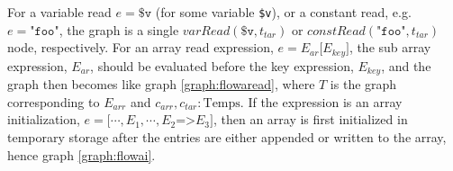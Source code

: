 \begin{graph}
{\begin{adjustbox}{max size={.24\textwidth}{.25\textheight}}
\end{adjustbox}}%
\hspace*{\fill}
\end{graph}

For a variable read $e = \texttt{\$v}$ (for some variable \texttt{\$v}), or a constant read, e.g. $e = \texttt{"foo"}$, the graph is a single $\mathit{varRead}(\texttt{\$v}, t_{tar})$ or $\mathit{constRead}(\texttt{"foo"}, t_{tar})$ node, respectively. For an array read expression, $e = E_{ar}\texttt[E_{key}\texttt{]}$, the sub array expression, $E_{ar}$, should be evaluated before the key expression, $E_{key}$, and the graph then becomes like graph \ref{graph:flowaread}, where $T$ is the graph corresponding to $E_{arr}$ and $c_{arr}, c_{tar} : \text{Temps}$. If the expression is an array initialization, $e = \texttt{[}\cdots, E_1, \cdots, E_2\texttt{=>}E_3\texttt{]}$, then an array is first initialized in temporary storage after the entries are either appended or written to the array, hence graph \ref{graph:flowai}.
